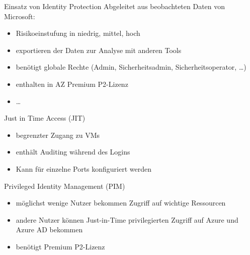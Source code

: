 \begin{flashcard}[Definition]{Einsatz von Identity Protection}
  Abgeleitet aus beobachteten Daten von Microsoft:
  \begin{itemize}
    \item Risikoeinstufung in niedrig, mittel, hoch
    \item exportieren der Daten zur Analyse mit anderen Tools
    \item benötigt globale Rechte (Admin, Sicherheitsadmin, Sicherheitsoperator, \ldots)
    \item enthalten in AZ Premium P2-Lizenz
    \item \ldots
  \end{itemize}
\end{flashcard}

\begin{flashcard}[Definition]{Just in Time Access (JIT)}
  \begin{itemize}
    \item begrenzter Zugang zu VMs
    \item enthält Auditing während des Logins
    \item Kann für einzelne Ports konfiguriert werden
  \end{itemize}
\end{flashcard}

\begin{flashcard}[Definition]{Privileged Identity Management (PIM)}
  \begin{itemize}
    \item möglichst wenige Nutzer bekommen Zugriff auf wichtige Ressourcen
    \item andere Nutzer können Just-in-Time privilegierten Zugriff auf Azure und Azure AD bekommen
    \item benötigt Premium P2-Lizenz
  \end{itemize}
\end{flashcard}

